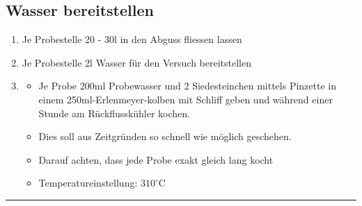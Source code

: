 \subsection{Wasser bereitstellen}
\begin{addmargin}[3cm]{0cm}
	\begin{enumerate}
		\item Je Probestelle 20 - 30l in den Abguss fliessen lassen
		
		\item Je Probestelle 2l Wasser für den Versuch bereitstellen
		
		\item \begin{itemize}
					\item	Je Probe 200ml Probewasser und 2 Siedesteinchen mittels Pinzette in einem 250ml-Erlenmeyer-kolben mit Schliff geben und während einer Stunde am Rückflusskühler kochen.
					
					\item	Dies soll aus Zeitgründen so schnell wie möglich geschehen.
					
					\item Darauf achten, dass jede Probe exakt gleich lang kocht
					
					\item Temperatureinstellung: $310^\circ$C
			  \end{itemize}
	\end{enumerate}
	
\end{addmargin}

\rule{\linewidth}{0.5mm}
